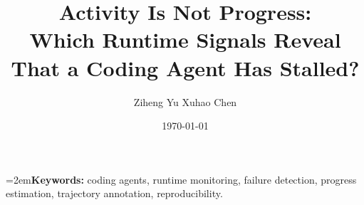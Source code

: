 \documentclass[10pt]{article}
\title{\vspace{-3.4em}Activity Is Not Progress:\\
Which Runtime Signals Reveal That a Coding Agent Has Stalled?}
\author{Ziheng Yu \quad Xuhao Chen}
\date{\today}
\begin{document}
\maketitle
\vspace{-1.2em}

\begin{abstract}

\end{abstract}
\vspace{-0.4em}

\noindent\hangindent=2em\textbf{Keywords:} coding agents, runtime monitoring, failure detection, progress
estimation, trajectory annotation, reproducibility.











{\small\setlength{\itemsep}{0pt}\setlength{\parsep}{0pt}
}
\end{document}
